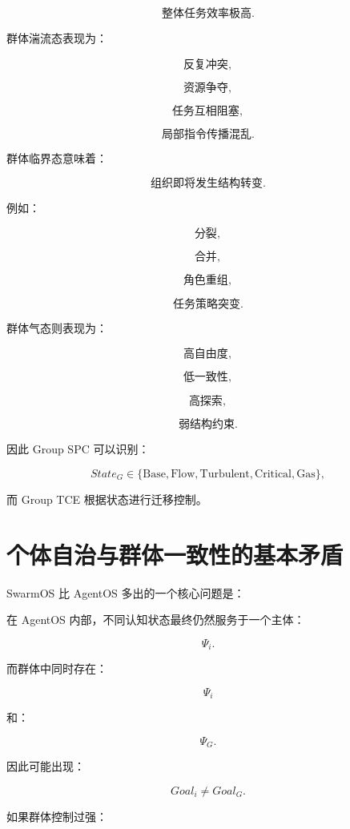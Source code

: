 \[
\text{整体任务效率极高}.
\]

群体湍流态表现为：

\[
\text{反复冲突},
\]

\[
\text{资源争夺},
\]

\[
\text{任务互相阻塞},
\]

\[
\text{局部指令传播混乱}.
\]

群体临界态意味着：

\[
\text{组织即将发生结构转变}.
\]

例如：

\[
\text{分裂},
\]

\[
\text{合并},
\]

\[
\text{角色重组},
\]

\[
\text{任务策略突变}.
\]

群体气态则表现为：

\[
\text{高自由度},
\]

\[
\text{低一致性},
\]

\[
\text{高探索},
\]

\[
\text{弱结构约束}.
\]

因此 Group SPC 可以识别：

\[
State_G
\in
\{
\text{Base},
\text{Flow},
\text{Turbulent},
\text{Critical},
\text{Gas}
\},
\]

而 Group TCE 根据状态进行迁移控制。


\section{个体自治与群体一致性的基本矛盾}

SwarmOS 比 AgentOS 多出的一个核心问题是：

\begin{statementbox}
\centering
{}
\end{statementbox}

在 AgentOS 内部，不同认知状态最终仍然服务于一个主体：

\[
\Psi_i.
\]

而群体中同时存在：

\[
\Psi_i
\]

和：

\[
\Psi_G.
\]

因此可能出现：

\[
Goal_i
\neq
Goal_G.
\]

如果群体控制过强：

